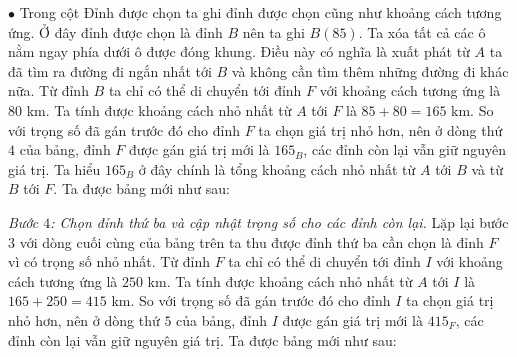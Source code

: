 \begin{multicols}{2}
	\vskip 0.1cm
	$\bullet$ Trong cột Đỉnh được chọn ta ghi đỉnh được chọn cũng như khoảng cách tương ứng. Ở đây đỉnh được chọn là đỉnh $B$ nên ta ghi $B(85)$.
	\vskip 0.1cm
	Ta xóa tất cả các ô nằm ngay phía dưới ô được đóng khung. Điều này có nghĩa là xuất phát từ $A$ ta đã tìm ra đường đi ngắn nhất tới $B$ và không cần tìm thêm những đường đi khác nữa. 
	\vskip 0.1cm
	Từ đỉnh $B$ ta chỉ có thể di chuyển tới đỉnh $F$ với khoảng cách tương ứng là $80$ km. Ta tính được khoảng cách nhỏ nhất từ $A$ tới $F$ là $85+80=165$ km. So với trọng số đã gán trước đó cho đỉnh $F$ ta chọn giá trị nhỏ hơn, nên ở dòng thứ $4$ của bảng, đỉnh $F$ được gán giá trị mới là $165_B$, các đỉnh còn lại vẫn giữ nguyên giá trị. Ta hiểu $165_B$ ở đây chính là tổng khoảng cách nhỏ nhất từ $A$ tới $B$ và từ $B$ tới $F$.
	\vskip 0.1cm 
	Ta được bảng mới như sau: 
	\begin{table}[H]
		\vspace*{-5pt}
		\centering
		\captionsetup{labelformat= empty, justification=centering}
		\vspace*{-10pt}
	\end{table}
	\textit{Bước $4$: Chọn đỉnh thứ ba và cập nhật trọng số cho các đỉnh còn lại.}  Lặp lại bước $3$ với dòng cuối cùng của bảng trên ta thu được đỉnh thứ ba cần chọn là đỉnh $F$ vì có trọng số nhỏ nhất. Từ đỉnh $F$ ta chỉ có thể di chuyển tới đỉnh $I$ với khoảng cách tương ứng là $250$ km. Ta tính được khoảng cách nhỏ nhất từ $A$ tới $I$ là $165+250=415$ km. So với trọng số đã gán trước đó cho đỉnh $I$ ta chọn giá trị nhỏ hơn, nên ở dòng thứ $5$ của bảng, đỉnh $I$ được gán giá trị mới là $415_F$, các đỉnh còn lại vẫn giữ nguyên giá trị. 
	\vskip 0.1cm
	Ta được bảng mới như sau: 
	\begin{table}[H]
		\vspace*{-5pt}

\end{table}
\end{multicols}

